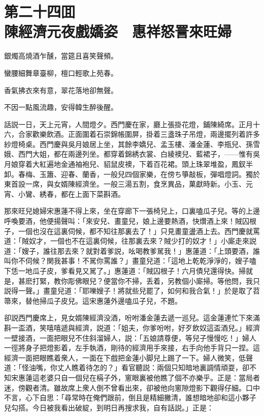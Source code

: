 
\chapter*{第二十四囬　\\陳經濟元夜戲嬌姿　惠祥怒詈來旺婦}


\begin{myquote}
銀燭高燒酒乍醺，當筵且喜笑聲頻。

蠻腰細舞章臺柳，檀口輕歌上苑春。

香氣拂衣來有意，翠花落地卻無聲。

不因一點風流趣，安得韓生醉後醒。
\end{myquote}

話説一日，天上元宵，人間燈夕。西門慶在家，廳上張掛花燈，鋪陳綺席。正月十六，合家歡樂飲酒。正面圍着石崇錦帳圍屏，掛着三盞珠子吊燈，兩邊擺列着許多紗燈椅桌。西門慶與吳月娘居上坐，其餘李嬌兒、孟玉樓、潘金蓮、李瓶兒、孫雪娥、西門大姐，都在兩邊列坐。都穿着錦綉衣裳、白綾襖兒、藍裙子，——惟有吳月娘穿着大紅遍地金通袖袍兒、貂鼠皮襖，下着百花裙。頭上珠翠堆盈，鳳釵半卸。春梅、玉簫、迎春、蘭香，一般兒四個家樂，在傍ち箏敲板，彈唱燈詞。獨於東首設一席，與女婿陳經濟坐。一般三湯五割，食烹異品，菓獻時新。小玉、元宵、小鸞、綉春，都在上面下菜斟酒。

那來旺兒媳婦宋惠蓮不得上來，坐在穿廊下一張椅兒上，口裏嗑瓜子兒。等的上邊呼喚要酒，他便揚聲叫：「來安兒、畫童兒，娘上邊要熱酒，快𤓎酒上來！賊囚根子，一個也沒在這裏伺候，都不知往那裏去了！」只見畫童盪酒上去。西門慶就罵道：「賊奴才，一個也不在這裏伺候，往那裏去來？賊少打的奴才！」小廝走來説道：「嫂子，誰往那去來？就對着爹説，吆喝教爹駡我！」惠蓮道：「上頭要酒，誰叫你不伺候？関我甚事！不駡你罵誰？」畫童兒道：「這地上乾乾淨淨的，嫂子嗑下恁一地瓜子皮，爹看見又駡了。」惠蓮道：「賊囚根子！六月債兒還得快。掃就是，甚麽打緊，教你彫佛眼兒？便當你不掃，丢着，另教個小廝掃。等他問，我只説得一聲。」畫童兒道：「耶嚛嫂子！將就些兒罷了，如何和我合氣！」於是取了苕箒來，替他掃瓜子皮兒。這宋惠蓮外邊嗑瓜子兒，不題。

卻説西門慶席上，見女婿陳經濟没酒，吩咐潘金蓮去遞一巡兒。這金蓮連忙下來滿斟一盃酒，笑嘻嘻遞與經濟，説道：「姐夫，你爹吩咐，好歹飲奴這盃酒兒。」經濟一壁接酒，一面把眼兒不住斜溜婦人，説：「五娘請尊便，等兒子慢慢吃！」婦人一徑將身子把燈影着，左手執酒，剛待的經濟用手來接，右手向他手背只一捏。這經濟一面把眼瞧着衆人，一面在下戲把金蓮小脚兒上踢了一下。婦人微笑，低聲道：「怪油嘴，你丈人瞧着待怎的？」看官聽説：兩個只知暗地裏調情頑耍，卻不知宋惠蓮這老婆只自一個兒在槅子外，窻眼裏被他瞧了個不亦樂乎。正是：當局者迷，傍觀者清。雖故席上衆人倒不曾看出來，卻被他向窻隙燈影下觀得仔細。口中不言，心下自思：「尋常時在俺們跟前，倒且是精細撇清，誰想暗地卻和這小夥子兒勾搭。今日被我看出破綻，到明日再搜求我，自有話説。」正是：

